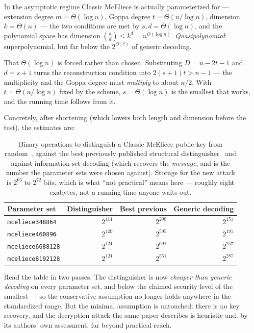 In the asymptotic regime Classic McEliece is actually parameterized for --- extension degree $m = \Theta(\log n)$, Goppa degree $t = \Theta(n/\log n)$, dimension $k = \Theta(n)$ --- the two conditions are met by $s,d = \Theta(\log n)$, and the polynomial space has dimension $\binom{k}{d} \le k^d = n^{O(\log n)}$. \emph{Quasipolynomial}: superpolynomial, but far below the $2^{\Theta(t)}$ of generic decoding.

That $\Theta(\log n)$ is forced rather than chosen. Substituting $D = n-2t-1$ and $d = s+1$ turns the reconstruction condition into $2(s+1)t > n-1$ --- the multiplicity and the Goppa degree must \emph{multiply} to about $n/2$. With $t = \Theta(n/\log n)$ fixed by the scheme, $s = \Theta(\log n)$ is the smallest that works, and the running time follows from it.

Concretely, after shortening (which lowers both length and dimension before the test), the estimates are:

\begin{table}[H]
\centering
\begin{tabular}{lrrr}
\toprule
Parameter set & Distinguisher & Best previous & Generic decoding \\
\midrule
\texttt{mceliece348864}  & $2^{114}$ & $2^{298}$ & $2^{151}$ \\
\texttt{mceliece460896}  & $2^{120}$ & $2^{595}$ & $2^{191}$ \\
\texttt{mceliece6688128} & $2^{124}$ & $2^{691}$ & $2^{257}$ \\
\texttt{mceliece8192128} & $2^{124}$ & $2^{551}$ & $2^{287}$ \\
\bottomrule
\end{tabular}
\caption{Binary operations to distinguish a Classic McEliece public key from random~\cite{gijs2026}, against the best previously published structural distinguisher~\cite{hw2025} and against information-set decoding (which recovers the \emph{message}, and is the number the parameter sets were chosen against). Storage for the new attack is $2^{66}$ to $2^{72}$ bits, which is what ``not practical'' means here --- roughly eight exabytes, not a running time anyone waits out.}
\label{tab:goppa-distinguishers}
\end{table}

Read the table in two passes. The distinguisher is now \emph{cheaper than generic decoding} on every parameter set, and below the claimed security level of the smallest --- so the conservative assumption no longer holds anywhere in the standardized range. But the minimal assumption is untouched: there is no key recovery, and the decryption attack the same paper describes is heuristic and, by its authors' own assessment, far beyond practical reach.

